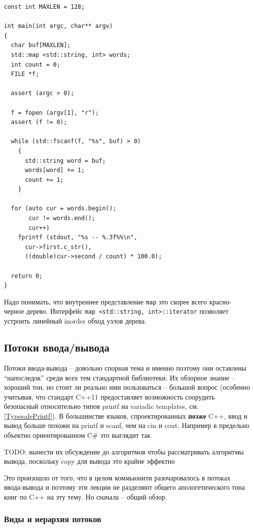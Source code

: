 \documentclass[a4paper,12pt,oneside]{article}
\begin{document}
\begin{lstlisting}
const int MAXLEN = 128;

int main(int argc, char** argv)
{
  char buf[MAXLEN];
  std::map <std::string, int> words;
  int count = 0;
  FILE *f;

  assert (argc > 0);

  f = fopen (argv[1], "r");
  assert (f != 0);

  while (std::fscanf(f, "%s", buf) > 0)
    {
      std::string word = buf;
      words[word] += 1;
      count += 1;
    }

  for (auto cur = words.begin();
       cur != words.end();
       cur++)
    fprintf (stdout, "%s -- %.3f%%\n", 
      cur->first.c_str(), 
      ((double)cur->second / count) * 100.0);

  return 0;
}
\end{lstlisting}

Надо понимать, что внутреннее представление \lstinline!map! это скорее всего красно-черное дерево. Интерфейс \lstinline!map <std::string, int>::iterator! позволяет устроить линейный inorder обход узлов дерева.

\pagebreak
\subsection{Потоки ввода/вывода}

Потоки ввода-вывода -- довольно спорная тема и именно поэтому они оставлены ``напоследок'' среди всех тем стандартной библиотеки. Их обзорное знание -- хороший тон, но стоит ли реально ими пользоваться -- большой вопрос (особенно учитывая, что стандарт C++11 предоставляет возможность соорудить безопасный относительно типов printf на variadic templates, см. \ref{TypesafePrintf}). В большинстве языков, спроектированных \textbf{позже} C++, ввод и вывод больше похожи на printf и scanf, чем на cin и cout. Например в предельно объектно ориентированном C\# это выглядит так

TODO: вынести их обсуждение до алгоритмов чтобы рассматривать алгоритмы вывода, поскольку copy для вывода это крайне эффектно

Это произошло от того, что в целом коммьюнити разочаровалось в потоках ввода-вывода и поэтому эти лекции не разделяют общего апологетического тона книг по C++ на эту тему. Но сначала -- общий обзор.

\subsubsection{Виды и иерархия потоков}
\end{document}
